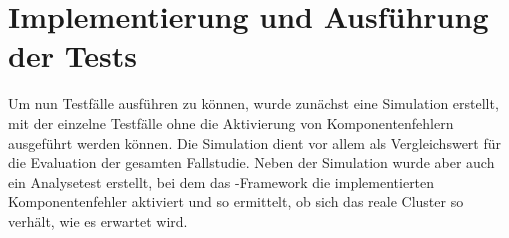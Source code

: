 \chapter{Implementierung und Ausführung der Tests}\label{chap:testExecution}

Um nun Testfälle ausführen zu können, wurde zunächst eine Simulation erstellt, mit der einzelne Testfälle ohne die Aktivierung von Komponentenfehlern ausgeführt werden können.
Die Simulation dient vor allem als Vergleichswert für die Evaluation der gesamten Fallstudie.
Neben der Simulation wurde aber auch ein Analysetest erstellt, bei dem das \sS-Framework die implementierten Komponentenfehler aktiviert und so ermittelt, ob sich das reale Cluster so verhält, wie es erwartet wird.







